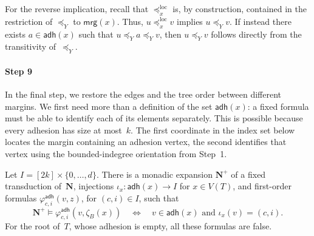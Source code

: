 \documentclass[1p,number,11pt]{elsarticle}
\theoremstyle{plain}
\newcommand{\mrg}{\mathsf{mrg}}
\newcommand{\adh}{\mathsf{adh}}
\begin{document}
For the reverse implication, recall that
$\preceq_x^{\mathrm{loc}}$ is, by construction, contained in the
restriction of $\preceq_Y$ to $\mrg(x)$. Thus,
$u\preceq_x^{\mathrm{loc}}v$ implies $u\preceq_Y v$. If instead there
exists $a\in\adh(x)$ such that
$u\preceq_Y a\preceq_Y v$, then $u\preceq_Y v$ follows directly from
the transitivity of~$\preceq_Y$.

\paragraph{Step 9}

In the final step, we restore the edges and the tree order between different
margins.  We first need more than a definition of the set $\adh(x)$: a fixed
formula must be able to identify each of its elements separately.  This is
possible because every adhesion has size at most~$k$.  The first coordinate
in the index set below locates the margin containing an adhesion vertex, the
second identifies that vertex using the bounded-indegree orientation from
Step~1.

\begin{lemma}\label{lem:adhesion}
Let $I=[2k]\times\{0,\ldots,d\}$.  There is a monadic expansion
$\mathbf N^+$ of a fixed transduction of~$\mathbf N$, injections $\iota_x:\adh(x)\longrightarrow I$ for $x\in V(T)$,
and first-order formulas $\varphi^{\adh}_{c,i}(v,z)$, for $(c,i)\in I$, such
that
\[
\mathbf N^+\models
   \varphi^{\adh}_{c,i}(v,\zeta_B(x))
\quad\Longleftrightarrow\quad
v\in\adh(x)\text{ and }\iota_x(v)=(c,i).
\]
For the root of~$T$, whose adhesion is empty, all these formulas are false.
\end{lemma}
\end{document}

